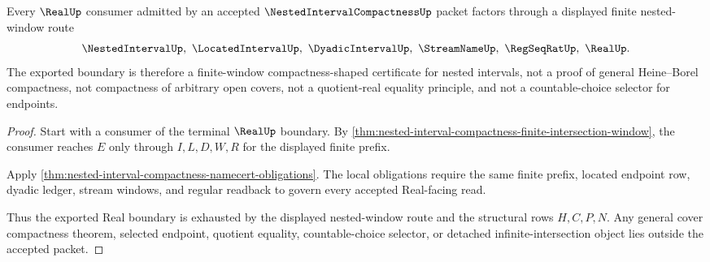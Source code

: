 \begin{theorem}
\label{thm:nested-interval-compactness-real-seal-boundary}
Every $\RealUp$ consumer admitted by an accepted $\NestedIntervalCompactnessUp$ packet factors through a displayed finite nested-window route
$$
\NestedIntervalUp,\ \LocatedIntervalUp,\ \DyadicIntervalUp,\ \StreamNameUp,\ \RegSeqRatUp,\ \RealUp .
$$
The exported boundary is therefore a finite-window compactness-shaped certificate for nested intervals, not a proof of general Heine--Borel compactness, not compactness of arbitrary open covers, not a quotient-real equality principle, and not a countable-choice selector for endpoints.
\end{theorem}
\begin{proof}
Start with a consumer of the terminal $\RealUp$ boundary. By \autoref{thm:nested-interval-compactness-finite-intersection-window}, the consumer reaches $E$ only through $I,L,D,W,R$ for the displayed finite prefix.

Apply \autoref{thm:nested-interval-compactness-namecert-obligations}. The local obligations require the same finite prefix, located endpoint row, dyadic ledger, stream windows, and regular readback to govern every accepted Real-facing read.

Thus the exported Real boundary is exhausted by the displayed nested-window route and the structural rows $H,C,P,N$. Any general cover compactness theorem, selected endpoint, quotient equality, countable-choice selector, or detached infinite-intersection object lies outside the accepted packet.
\end{proof}

